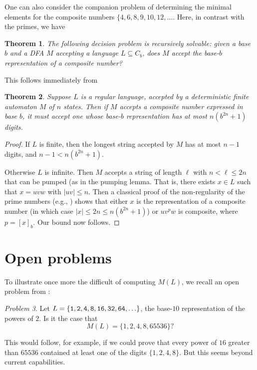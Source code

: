 \documentclass[12pt]{article}
\theoremstyle{plain}
\newtheorem{theorem}{Theorem}
\theoremstyle{definition}
\theoremstyle{remark}
\newtheorem{problem}[theorem]{Problem}
\begin{document}
One can also consider the companion problem of determining the
minimal elements for the composite numbers
$\lbrace 4,6,8,9,10, 12, \ldots $.  
Here, in contrast with the primes, we have

\begin{theorem}
The following decision problem is recursively solvable:  given
a base $b$ and a DFA $M$ accepting a language $L \subseteq 
C_b$, does $M$ accept the base-$b$ representation of a composite 
number?
\end{theorem}

This follows immediately from

\begin{theorem}
Suppose $L$ is a regular language, accepted by a 
deterministic finite automaton $M$ of $n$ states.  Then
if $M$ accepts a composite number expressed in base $b$, it must
accept one whose base-$b$ representation has at most
$n(b^{2n} + 1)$ digits.
\end{theorem}

\begin{proof}
If $L$ is finite, then the longest string accepted by $M$ has
at most $n-1$ digits, and $n-1 < n(b^{2n} + 1)$.

Otherwise $L$ is infinite.  Then $M$ accepts a string of length
$\ell$ with $n < \ell \leq 2n$ that can be pumped (as in the
pumping lemma.  That is, there exists $x \in L$ such that
$x = uvw$ with $|uv| \leq n$.  Then a classical proof of the
non-regularity of the prime numbers 
(e.g., \cite[Example 3.2, p.\ 57]{HU79})
shows that either $x$ is the representation of a composite 
number (in which case $|x| \leq 2n \leq n(b^{2n} + 1)$)
or $u v^p w$ is composite, where $p = [x]_b$.  
Our bound now follows.
\end{proof}

\section{Open problems}

To illustrate once more the difficult of computing $M(L)$, we recall
an open problem from \cite{Sh00}:

\begin{problem} 
Let $L = \lbrace {\tt 1, 2, 4, 8, 16, 32, 64, } \ldots \rbrace$, the
base-$10$ representation of the powers of $2$.  
Is it the case that
$$ M(L) = \lbrace 1, 2, 4, 8, 65536 \rbrace ? $$
\end{problem}

This would follow, for example, if we could prove that every power
of $16$ greater than $65536$ contained at least one of the digits
$\lbrace 1,2,4, 8 \rbrace$.  But this seems beyond current capabilities.
\end{document}
